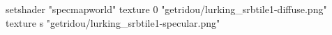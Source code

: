 setshader "specmapworld"
texture 0 "getridou/lurking_srbtile1-diffuse.png"
texture s "getridou/lurking_srbtile1-specular.png"